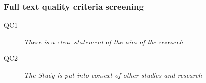 \documentclass[a4paper]{book}
\begin{document}
\begin{appendices}
				\subsubsection{Full text quality criteria screening}

				\begin{description}
				\item[QC1] {\it There is a clear statement of the aim of the research} 
				\item[QC2] {\it The Study is put into context of other studies and research}
				\end{description}




\end{appendices}
\end{document}
